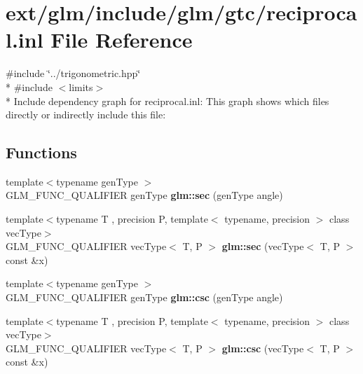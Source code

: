 \hypertarget{reciprocal_8inl}{\section{ext/glm/include/glm/gtc/reciprocal.inl File Reference}
\label{reciprocal_8inl}
}
{\ttfamily \#include \char`\"{}../trigonometric.\-hpp\char`\"{}}\\*
{\ttfamily \#include $<$limits$>$}\\*
Include dependency graph for reciprocal.\-inl\-:
This graph shows which files directly or indirectly include this file\-:
\subsection*{Functions}
\begin{DoxyCompactItemize}
\item 
\hypertarget{namespaceglm_a50ae4a1b04d5ff626db13d6bb92a2c9e}{{\footnotesize template$<$typename gen\-Type $>$ }\\G\-L\-M\-\_\-\-F\-U\-N\-C\-\_\-\-Q\-U\-A\-L\-I\-F\-I\-E\-R gen\-Type {\bfseries glm\-::sec} (gen\-Type angle)}\label{namespaceglm_a50ae4a1b04d5ff626db13d6bb92a2c9e}

\item 
\hypertarget{namespaceglm_ab94ec38d09e409a1d0b402961a186d5d}{{\footnotesize template$<$typename T , precision P, template$<$ typename, precision $>$ class vec\-Type$>$ }\\G\-L\-M\-\_\-\-F\-U\-N\-C\-\_\-\-Q\-U\-A\-L\-I\-F\-I\-E\-R vec\-Type$<$ T, P $>$ {\bfseries glm\-::sec} (vec\-Type$<$ T, P $>$ const \&x)}\label{namespaceglm_ab94ec38d09e409a1d0b402961a186d5d}

\item 
\hypertarget{namespaceglm_a5342fb605ca415a20df6895720b1cdae}{{\footnotesize template$<$typename gen\-Type $>$ }\\G\-L\-M\-\_\-\-F\-U\-N\-C\-\_\-\-Q\-U\-A\-L\-I\-F\-I\-E\-R gen\-Type {\bfseries glm\-::csc} (gen\-Type angle)}\label{namespaceglm_a5342fb605ca415a20df6895720b1cdae}

\item 
\hypertarget{namespaceglm_a3bdd2d38714ee045d866807ae9574882}{{\footnotesize template$<$typename T , precision P, template$<$ typename, precision $>$ class vec\-Type$>$ }\\G\-L\-M\-\_\-\-F\-U\-N\-C\-\_\-\-Q\-U\-A\-L\-I\-F\-I\-E\-R vec\-Type$<$ T, P $>$ {\bfseries glm\-::csc} (vec\-Type$<$ T, P $>$ const \&x)}\label{namespaceglm_a3bdd2d38714ee045d866807ae9574882}


\end{DoxyCompactItemize}
